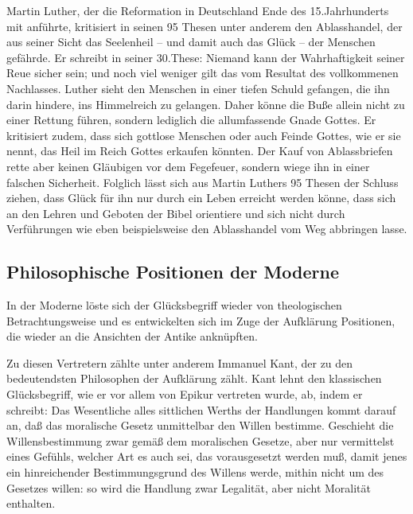 Martin Luther, der die Reformation in Deutschland Ende des 15.Jahrhunderts mit anführte, kritisiert in seinen 95 Thesen unter anderem den Ablasshandel, der aus seiner Sicht das Seelenheil -- und damit auch das Glück -- der Menschen gefährde. 
Er schreibt in seiner 30.These: \glqq Niemand kann der Wahrhaftigkeit seiner Reue sicher sein; und noch viel weniger gilt das vom Resultat des vollkommenen Nachlasses.\grqq{}\cite{ML65, S.56}
Luther sieht den Menschen in einer tiefen Schuld gefangen, die ihn darin hindere, ins Himmelreich zu gelangen. 
Daher könne die Buße allein nicht zu einer Rettung führen, sondern lediglich die allumfassende Gnade Gottes. 
Er kritisiert zudem, dass sich gottlose Menschen oder auch Feinde Gottes, wie er sie nennt, das Heil im Reich Gottes erkaufen könnten. 
Der Kauf von Ablassbriefen rette aber keinen Gläubigen vor dem Fegefeuer, sondern wiege ihn in einer falschen Sicherheit\cite{ML65, S.58}.
Folglich lässt sich aus Martin Luthers 95 Thesen der Schluss ziehen, dass Glück für ihn nur durch ein Leben erreicht werden könne, dass sich an den Lehren und Geboten der Bibel orientiere und sich nicht durch Verführungen wie eben beispielsweise den Ablasshandel vom Weg abbringen lasse.


\newpage

\subsection{Philosophische Positionen der Moderne}

In der Moderne löste sich der Glücksbegriff wieder von theologischen Betrachtungsweise und es entwickelten sich im Zuge der Aufklärung Positionen, die wieder an die Ansichten der Antike anknüpften. 

Zu diesen Vertretern zählte unter anderem Immanuel Kant, der zu den bedeutendsten Philosophen der Aufklärung zählt. 
Kant lehnt den klassischen Glücksbegriff, wie er vor allem von Epikur vertreten wurde, ab, indem er schreibt: \glqq Das Wesentliche alles sittlichen Werths der Handlungen kommt darauf an, daß das moralische Gesetz unmittelbar den Willen bestimme. 
Geschieht die Willensbestimmung zwar gemäß dem moralischen Gesetze, aber nur vermittelst eines Gefühls, welcher Art es auch sei, das vorausgesetzt werden muß, damit jenes ein hinreichender Bestimmungsgrund des Willens werde, mithin nicht um des Gesetzes willen: so wird die Handlung zwar Legalität, aber nicht Moralität enthalten.\grqq{}\cite{IK74, S. 71}

